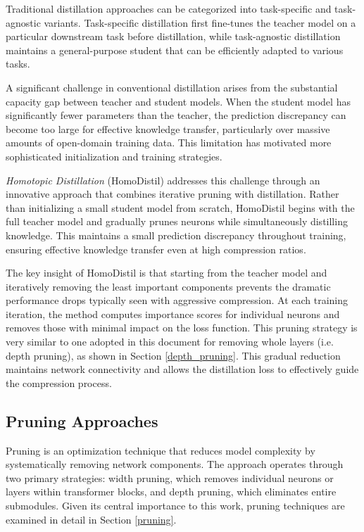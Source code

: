Traditional distillation approaches can be categorized into task-specific and task-agnostic variants. Task-specific distillation first fine-tunes the teacher model on a particular downstream task before distillation, while task-agnostic distillation maintains a general-purpose student that can be efficiently adapted to various tasks.

A significant challenge in conventional distillation arises from the substantial capacity gap between teacher and student models. When the student model has significantly fewer parameters than the teacher, the prediction discrepancy can become too large for effective knowledge transfer, particularly over massive amounts of open-domain training data. This limitation has motivated more sophisticated initialization and training strategies.

\textit{Homotopic Distillation} (HomoDistil) \cite{homodistil} addresses this challenge through an innovative approach that combines iterative pruning with distillation. Rather than initializing a small student model from scratch, HomoDistil begins with the full teacher model and gradually prunes neurons while simultaneously distilling knowledge. This maintains a small prediction discrepancy throughout training, ensuring effective knowledge transfer even at high compression ratios.

The key insight of HomoDistil is that starting from the teacher model and iteratively removing the least important components prevents the dramatic performance drops typically seen with aggressive compression. At each training iteration, the method computes importance scores for individual neurons and removes those with minimal impact on the loss function. This pruning strategy is very similar to one adopted in this document for removing whole layers (i.e. depth pruning), as shown in Section \ref{depth_pruning}. This gradual reduction maintains network connectivity and allows the distillation loss to effectively guide the compression process.

\subsection{Pruning Approaches}

Pruning is an optimization technique that reduces model complexity by systematically removing network components. The approach operates through two primary strategies: width pruning, which removes individual neurons or layers within transformer blocks, and depth pruning, which eliminates entire submodules. Given its central importance to this work, pruning techniques are examined in detail in Section \ref{pruning}.

